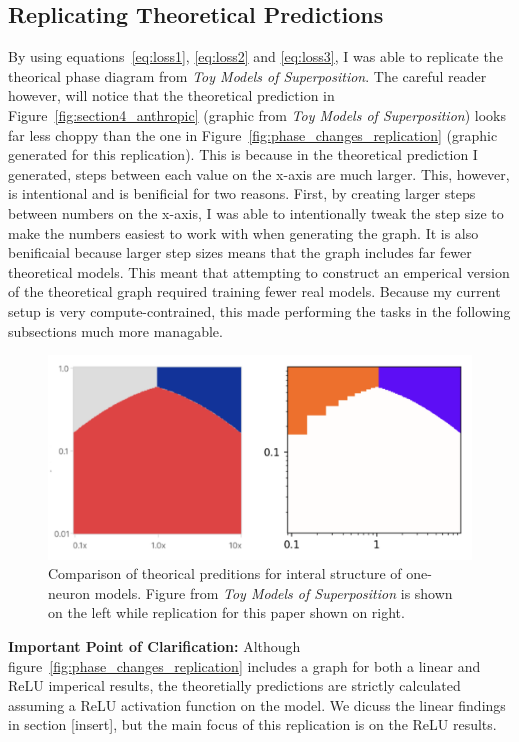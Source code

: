 \documentclass{article} %
\begin{document}
\subsection{Replicating Theoretical Predictions}

By using equations~\ref{eq:loss1}, \ref{eq:loss2} and \ref{eq:loss3},
I was able to replicate the theorical phase diagram from
\textit{Toy Models of Superposition}.
The careful reader however, will notice that the theoretical prediction in
Figure~\ref{fig:section4_anthropic} (graphic from \textit{Toy Models of 
Superposition}) looks far less choppy than the one in Figure~\ref{fig:phase_changes_replication} (graphic
generated for this replication). This is because in the theoretical prediction I 
generated, steps between each value on the x-axis are much larger. This, however, is
intentional and is benificial for two reasons. First, by creating larger steps 
between numbers on
the x-axis, I was able to intentionally tweak the step size to make the numbers
easiest to work with when generating the graph. It is also benificaial because
larger step sizes means that the graph includes far fewer theoretical
models. This meant that attempting to construct an emperical version of the theoretical graph 
required training fewer real models. Because my current setup is very 
compute-contrained, this made performing the tasks in the following subsections
much more managable.

\begin{figure}[h]
    \centering
    \includegraphics[width=0.5\linewidth]{phase_changes/images/theoretical_predictions.png}
    \captionsetup{font=footnotesize, width=0.7\linewidth} %
    \caption{
        Comparison of theorical preditions for interal structure of one-neuron 
        models. Figure from \textit{Toy Models of Superposition} is shown on the 
        left while replication for this paper shown on right. 
    }
    \label{fig:theoretical_preditions}
\end{figure}

\textbf{Important Point of Clarification:} Although 
figure~\ref{fig:phase_changes_replication} includes a graph for both a linear and ReLU
imperical results, the theoretially predictions are strictly calculated assuming
a ReLU activation function on the model. We dicuss the linear findings in section
[insert], but the main focus of this replication is on the ReLU results.
\end{document}
